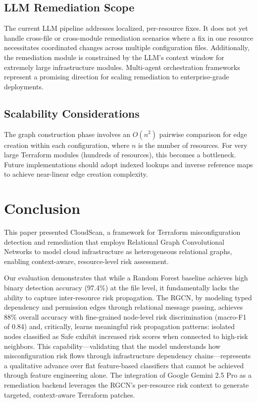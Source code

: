 \documentclass[conference]{IEEEtran}
\begin{document}
\subsection{LLM Remediation Scope}

The current LLM pipeline addresses localized, per-resource fixes. It does not yet handle cross-file or cross-module remediation scenarios where a fix in one resource necessitates coordinated changes across multiple configuration files. Additionally, the remediation module is constrained by the LLM's context window for extremely large infrastructure modules. Multi-agent orchestration frameworks~\cite{khan2024} represent a promising direction for scaling remediation to enterprise-grade deployments.

\subsection{Scalability Considerations}

The graph construction phase involves an $O(n^2)$ pairwise comparison for edge creation within each configuration, where $n$ is the number of resources. For very large Terraform modules (hundreds of resources), this becomes a bottleneck. Future implementations should adopt indexed lookups and inverse reference maps to achieve near-linear edge creation complexity.

\section{Conclusion}

This paper presented CloudScan, a framework for Terraform misconfiguration detection and remediation that employs Relational Graph Convolutional Networks to model cloud infrastructure as heterogeneous relational graphs, enabling context-aware, resource-level risk assessment.

Our evaluation demonstrates that while a Random Forest baseline achieves high binary detection accuracy (97.4\%) at the file level, it fundamentally lacks the ability to capture inter-resource risk propagation. The RGCN, by modeling typed dependency and permission edges through relational message passing, achieves 88\% overall accuracy with fine-grained node-level risk discrimination (macro-F1 of 0.84) and, critically, learns meaningful risk propagation patterns: isolated nodes classified as Safe exhibit increased risk scores when connected to high-risk neighbors. This capability---validating that the model understands how misconfiguration risk flows through infrastructure dependency chains---represents a qualitative advance over flat feature-based classifiers that cannot be achieved through feature engineering alone. The integration of Google Gemini 2.5 Pro as a remediation backend leverages the RGCN's per-resource risk context to generate targeted, context-aware Terraform patches.
\end{document}
